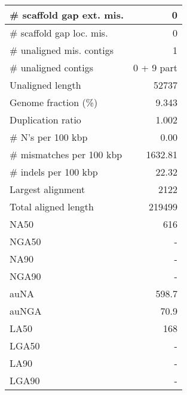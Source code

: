 \documentclass[12pt,a4paper]{article}
\begin{document}
\begin{table}[ht]
\begin{center}
\begin{tabular}{|l*{1}{|r}|}
\# scaffold gap ext. mis. & 0 \\ \hline
\# scaffold gap loc. mis. & 0 \\ \hline
\# unaligned mis. contigs & 1 \\ \hline
\# unaligned contigs & 0 + 9 part \\ \hline
Unaligned length & 52737 \\ \hline
Genome fraction (\%) & 9.343 \\ \hline
Duplication ratio & 1.002 \\ \hline
\# N's per 100 kbp & 0.00 \\ \hline
\# mismatches per 100 kbp & 1632.81 \\ \hline
\# indels per 100 kbp & 22.32 \\ \hline
Largest alignment & 2122 \\ \hline
Total aligned length & 219499 \\ \hline
NA50 & 616 \\ \hline
NGA50 & - \\ \hline
NA90 & - \\ \hline
NGA90 & - \\ \hline
auNA & 598.7 \\ \hline
auNGA & 70.9 \\ \hline
LA50 & 168 \\ \hline
LGA50 & - \\ \hline
LA90 & - \\ \hline
LGA90 & - \\ \hline
\end{tabular}
\end{center}
\end{table}
\end{document}
